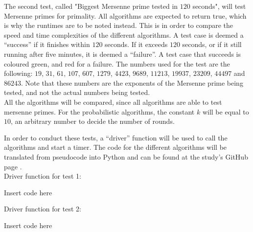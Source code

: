 \documentclass[main.tex]{subfiles}
\begin{document}
The second test, called "Biggest Mersenne prime tested in $120$ seconds", will
test Mersenne primes for primality. All algorithms are expected to return true,
which is why the runtimes are to be noted instead. This is in order to compare
the speed and time complexities of the different algorithms. A test case is
deemed a ``success'' if it finishes within $120$ seconds. If it exceeds $120$
seconds, or if it still running after five minutes, it is deemed a ``failure''.
A test case that succeeds is coloured green, and red for a failure. The numbers
used for the test are the following: $19$, $31$, $61$, $107$, $607$, $1279$,
$4423$, $9689$, $11213$, $19937$, $23209$, $44497$ and $86243$. Note that these
numbers are the exponents of the Mersenne prime being tested, and not
the actual numbers being tested. \\

All the algorithms will be compared, since all algorithms are able to test
mersenne primes. For the probabilistic algorithms, the constant $k$ will be
equal to $10$, an arbitrary number to decide the number of rounds. \newline

In order to conduct these tests, a ``driver'' function will be used to call the
algorithms and start a timer. The code for the different algorithms will be
translated from pseudocode into Python and can be found at the study's GitHub
page \cite{github}. \\

Driver function for test 1:

\begin{python}
  Insert code here
\end{python}

\vspace{5mm}

Driver function for test 2:

\begin{python}
  Insert code here
\end{python}
\end{document}
